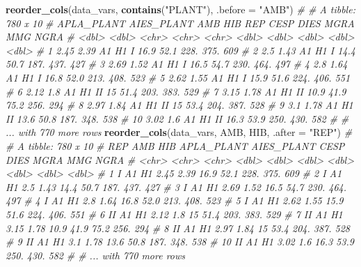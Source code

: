 \documentclass[
]{book}
\newenvironment{Shaded}{\begin{snugshade}}{\end{snugshade}}
\newcommand{\CommentTok}[1]{\textcolor[rgb]{0.56,0.35,0.01}{\textit{#1}}}
\newcommand{\DataTypeTok}[1]{\textcolor[rgb]{0.13,0.29,0.53}{#1}}
\newcommand{\KeywordTok}[1]{\textcolor[rgb]{0.13,0.29,0.53}{\textbf{#1}}}
\newcommand{\NormalTok}[1]{#1}
\newcommand{\StringTok}[1]{\textcolor[rgb]{0.31,0.60,0.02}{#1}}
\begin{document}
\begin{Shaded}
\begin{Highlighting}[]
\KeywordTok{reorder_cols}\NormalTok{(data_vars, }\KeywordTok{contains}\NormalTok{(}\StringTok{"PLANT"}\NormalTok{), }\DataTypeTok{.before =} \StringTok{"AMB"}\NormalTok{)}
\CommentTok{# # A tibble: 780 x 10}
\CommentTok{#    APLA_PLANT AIES_PLANT AMB   HIB   REP    CESP  DIES  MGRA   MMG  NGRA}
\CommentTok{#         <dbl>      <dbl> <chr> <chr> <chr> <dbl> <dbl> <dbl> <dbl> <dbl>}
\CommentTok{#  1       2.45       2.39 A1    H1    I      16.9  52.1 228.   375.   609}
\CommentTok{#  2       2.5        1.43 A1    H1    I      14.4  50.7 187.   437.   427}
\CommentTok{#  3       2.69       1.52 A1    H1    I      16.5  54.7 230.   464.   497}
\CommentTok{#  4       2.8        1.64 A1    H1    I      16.8  52.0 213.   408.   523}
\CommentTok{#  5       2.62       1.55 A1    H1    I      15.9  51.6 224.   406.   551}
\CommentTok{#  6       2.12       1.8  A1    H1    II     15    51.4 203.   383.   529}
\CommentTok{#  7       3.15       1.78 A1    H1    II     10.9  41.9  75.2  256.   294}
\CommentTok{#  8       2.97       1.84 A1    H1    II     15    53.4 204.   387.   528}
\CommentTok{#  9       3.1        1.78 A1    H1    II     13.6  50.8 187.   348.   538}
\CommentTok{# 10       3.02       1.6  A1    H1    II     16.3  53.9 250.   430.   582}
\CommentTok{# # ... with 770 more rows}
\KeywordTok{reorder_cols}\NormalTok{(data_vars, AMB, HIB, }\DataTypeTok{.after =} \StringTok{"REP"}\NormalTok{)}
\CommentTok{# # A tibble: 780 x 10}
\CommentTok{#    REP   AMB   HIB   APLA_PLANT AIES_PLANT  CESP  DIES  MGRA   MMG  NGRA}
\CommentTok{#    <chr> <chr> <chr>      <dbl>      <dbl> <dbl> <dbl> <dbl> <dbl> <dbl>}
\CommentTok{#  1 I     A1    H1          2.45       2.39  16.9  52.1 228.   375.   609}
\CommentTok{#  2 I     A1    H1          2.5        1.43  14.4  50.7 187.   437.   427}
\CommentTok{#  3 I     A1    H1          2.69       1.52  16.5  54.7 230.   464.   497}
\CommentTok{#  4 I     A1    H1          2.8        1.64  16.8  52.0 213.   408.   523}
\CommentTok{#  5 I     A1    H1          2.62       1.55  15.9  51.6 224.   406.   551}
\CommentTok{#  6 II    A1    H1          2.12       1.8   15    51.4 203.   383.   529}
\CommentTok{#  7 II    A1    H1          3.15       1.78  10.9  41.9  75.2  256.   294}
\CommentTok{#  8 II    A1    H1          2.97       1.84  15    53.4 204.   387.   528}
\CommentTok{#  9 II    A1    H1          3.1        1.78  13.6  50.8 187.   348.   538}
\CommentTok{# 10 II    A1    H1          3.02       1.6   16.3  53.9 250.   430.   582}
\CommentTok{# # ... with 770 more rows}
\end{Highlighting}
\end{Shaded}
\end{document}
